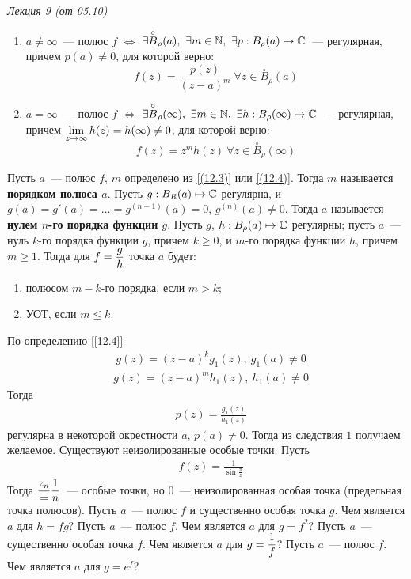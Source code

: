 \begin{flushright}
    \textit{Лекция 9 (от 05.10)}
\end{flushright}
\corollary
\begin{enumerate}
    \item $a \neq \infty$~--- полюс $f$ $\Leftrightarrow$ $\exists
    \overset{\circ}{B}_{\rho}(a), \ \exists m \in \mathbb{N}, \ \exists p: B_{\rho}(a)
    \mapsto \mathbb{C}$~--- регулярная, причем $p(a) \neq 0$, для которой верно:
    \begin{equation}\label{(12.3)}
        f(z) = \frac{p(z)}{(z-a)^m} \ \forall z \in \overset{\circ}{B}_\rho(a)
    \end{equation}
    \item $a = \infty$~--- полюс $f$ $\Leftrightarrow$ $\exists
    \overset{\circ}{B}_{\rho}(\infty), \ \exists m \in \mathbb{N}, \ \exists h:
    B_{\rho}(\infty) \mapsto \mathbb{C}$~--- регулярная, причем $\displaystyle\lim_{z \to
      \infty} h(z) = h(\infty) \neq 0$, для которой верно:
    \begin{equation}\label{(12.4)}
        f(z) = z^mh(z) \ \forall z \in \overset{\circ}{B}_\rho(\infty)
    \end{equation}
\end{enumerate}
\Def \label{[12.3]}
Пусть $a$~--- полюс $f$, $m$ определено из \eqref{(12.3)} или
\eqref{(12.4)}. Тогда $m$ называется \textbf{порядком полюса $a$}.
\Def \label{[12.4]}
Пусть $g: B_R(a) \mapsto \mathbb{C}$ регулярна, и $g(a) = g'(a) = \dots = g^{(n-1)}(a)
= 0$, $g^{(n)}(a)\neq 0$. Тогда $a$ называется \textbf{нулем $n$-го порядка
  функции $g$}.
\corollary
Пусть $g$, $h: B_\rho(a) \mapsto \mathbb{C}$ регулярны; пусть $a$~--- нуль $k$-го
порядка функции $g$, причем $k \geq 0$, и $m$-го порядка функции $h$, причем $m
\geq 1$. Тогда для $f = \displaystyle \frac{g}{h}$ точка $a$ будет:
\begin{enumerate}
    \item полюсом $m-k$-го порядка, если $m > k$;
    \item УОТ, если $m \leq k$.
\end{enumerate}
\pr
По определению \ref{[12.4]}
\begin{align*}
  & g(z) = (z-a)^kg_1(z), \ g_1(a) \neq 0
\end{align*}
\begin{align*}
  & g(z) = (z-a)^mh_1(z), \ h_1(a) \neq 0
\end{align*}
Тогда
\begin{align*}
  & p(z) = \frac{g_1(z)}{h_1(z)}
\end{align*}
регулярна в некоторой окрестности $a$, $p(a) \neq 0$. Тогда из следствия $1$
получаем желаемое.
\note
Существуют неизолированные особые точки. Пусть
\begin{align*}
  & f(z) = \frac{1}{\sin \frac{\pi}{z}}
\end{align*}
Тогда $\displaystyle \frac{z_n} = \frac{1}{n}$~--- особые точки, но $0$~---
неизолированная особая точка (предельная точка полюсов).
\Exse
Пусть $a$~--- полюс $f$ и существенно особая точка $g$. Чем является $a$ для $h
= fg$?
\Exse
Пусть $a$~--- полюс $f$. Чем является $a$ для $g= f^2$?
\Exse
Пусть $a$~--- существенно особая точка $f$. Чем является $a$ для $g = \displaystyle
\frac{1}{f}$?
\Exse
Пусть $a$~--- полюс $f$. Чем является $a$ для $g = e^f$?
